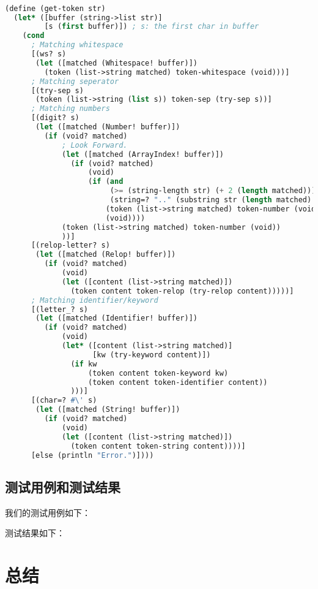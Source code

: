 \documentclass[lang=cn]{elegantpaper}
\begin{document}
\begin{lstlisting}[language=lisp]

(define (get-token str)
  (let* ([buffer (string->list str)]
         [s (first buffer)]) ; s: the first char in buffer
    (cond
      ; Matching whitespace
      [(ws? s)
       (let ([matched (Whitespace! buffer)])
         (token (list->string matched) token-whitespace (void)))]
      ; Matching seperator
      [(try-sep s)
       (token (list->string (list s)) token-sep (try-sep s))]
      ; Matching numbers
      [(digit? s)
       (let ([matched (Number! buffer)])
         (if (void? matched)
             ; Look Forward.
             (let ([matched (ArrayIndex! buffer)])
               (if (void? matched)
                   (void)
                   (if (and
                        (>= (string-length str) (+ 2 (length matched)))
                        (string=? ".." (substring str (length matched) (+ 2 (length matched)))))
                       (token (list->string matched) token-number (void))
                       (void))))
             (token (list->string matched) token-number (void))
             ))]
      [(relop-letter? s)
       (let ([matched (Relop! buffer)])
         (if (void? matched)
             (void)
             (let ([content (list->string matched)])
               (token content token-relop (try-relop content)))))]
      ; Matching identifier/keyword
      [(letter_? s)
       (let ([matched (Identifier! buffer)])
         (if (void? matched)
             (void)
             (let* ([content (list->string matched)]
                    [kw (try-keyword content)])
               (if kw
                   (token content token-keyword kw)
                   (token content token-identifier content))
               )))]
      [(char=? #\' s)
       (let ([matched (String! buffer)])
         (if (void? matched)
             (void)
             (let ([content (list->string matched)])
               (token content token-string content))))]
      [else (println "Error.")])))
\end{lstlisting}

\subsection{测试用例和测试结果}

我们的测试用例如下：



测试结果如下：


\section{总结}
\end{document}
